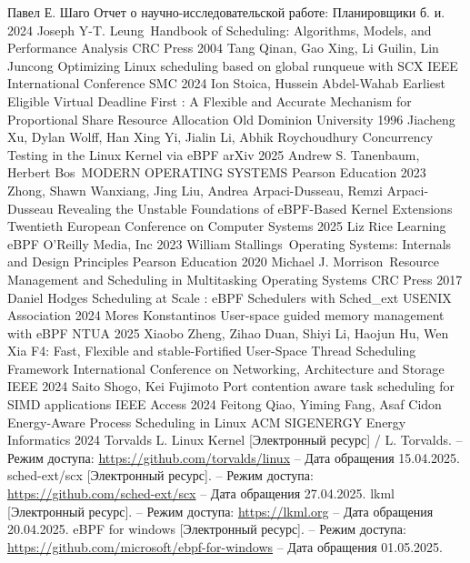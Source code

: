 \documentclass[12pt, oneside]{book}
\begin{document}
\renewcommand{\bibname}{\large СПИСОК ИСПОЛЬЗОВАННЫХ ИСТОЧНИКОВ}
\begin{thebibliography}{9}
  \vspace*{0.3cm}
  Павел Е. Шаго Отчет о научно-исследовательской работе: Планировщики б. и. 2024
  Joseph Y-T. Leung\ Handbook of Scheduling: Algorithms, Models, and
  Performance Analysis CRC Press 2004
   Tang Qinan, Gao Xing, Li Guilin, Lin Juncong Optimizing Linux
  scheduling based on global runqueue with SCX IEEE International Conference SMC 2024
  Ion Stoica, Hussein Abdel-Wahab Earliest Eligible Virtual Deadline First
  : A Flexible and Accurate Mechanism for Proportional Share Resource Allocation 
  Old Dominion University 1996
  Jiacheng Xu, Dylan Wolff, Han Xing Yi, Jialin Li, Abhik Roychoudhury 
  Concurrency Testing in the Linux Kernel via eBPF arXiv 2025
  Andrew S. Tanenbaum, Herbert Bos\ MODERN OPERATING SYSTEMS Pearson
  Education 2023
  Zhong, Shawn Wanxiang, Jing Liu, Andrea Arpaci-Dusseau, Remzi Arpaci-Dusseau
  Revealing the Unstable Foundations of eBPF-Based Kernel Extensions Twentieth
  European Conference on Computer Systems 2025
  Liz Rice Learning eBPF O’Reilly Media, Inc 2023
  William Stallings\ Operating Systems: Internals and
  Design Principles Pearson Education 2020
  Michael J. Morrison\ Resource Management and Scheduling
  in Multitasking Operating Systems CRC Press 2017
  Daniel Hodges Scheduling at Scale : eBPF Schedulers with 
  Sched\_ext USENIX Association 2024
  Mores Konstantinos User-space guided memory management with eBPF
  NTUA 2025
  Xiaobo Zheng, Zihao Duan, Shiyi Li, Haojun Hu, Wen Xia
  F4: Fast, Flexible and stable-Fortified User-Space Thread Scheduling Framework
  International Conference on Networking, Architecture and Storage IEEE 2024
  Saito Shogo, Kei Fujimoto Port contention aware task scheduling for SIMD applications
  IEEE Access 2024
  Feitong Qiao, Yiming Fang, Asaf Cidon Energy-Aware Process Scheduling in Linux
  ACM SIGENERGY Energy Informatics 2024
  Torvalds L. Linux Kernel [Электронный ресурс] / L. Torvalds.
  -- Режим доступа: \url{https://github.com/torvalds/linux} -- Дата обращения
  15.04.2025.
  sched-ext/scx [Электронный ресурс]. -- Режим доступа: \\
  \url{https://github.com/sched-ext/scx} -- Дата обращения 27.04.2025.
  lkml [Электронный ресурс]. -- Режим доступа: \url{https://lkml.org}
  -- Дата обращения 20.04.2025.
  eBPF for windows [Электронный ресурс]. -- Режим доступа: 
  \url{https://github.com/microsoft/ebpf-for-windows}
  -- Дата обращения 01.05.2025.
\end{thebibliography}
\end{document}
